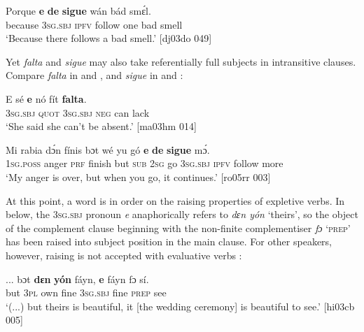 \ea%
    \label{ex:key:1149}
    \gll Porque  \textbf{e}    \textbf{de}  \textbf{sigue}  wán  bád  smɛ́l.\\
because  \textsc{3sg.sbj}  \textsc{ipfv}  follow  one  bad  smell\\

\glt ‘Because there follows a bad smell.’   [dj03do 049]
\z

Yet \textit{falta} and \textit{sigue} may also take referentially full subjects in intransitive clauses. Compare \textit{falta} in  and , and \textit{sigue} in  and :


\ea%
    \label{ex:key:1150}
    \gll \textsc{E}    sé    \textbf{e}    nó  fít    \textbf{falta}.\\
\textsc{3sg.sbj}  \textsc{quot}    \textsc{3sg.sbj}  \textsc{neg}  can    lack\\

\glt ‘She said she can’t be absent.’ [ma03hm 014]
\z


\ea%
    \label{ex:key:1151}
    \gll Mi    rabia  dɔ́n  fínis    bɔt  wé  yu  gó
\textbf{e}    \textbf{de}  \textbf{sigue}  mɔ́.\\
\textsc{1sg.poss}  anger  \textsc{prf}  finish  but  \textsc{sub}  \textsc{2sg}  go
\textsc{3sg.sbj}  \textsc{ipfv}  follow  more\\

\glt ‘My anger is over, but when you go, it continues.’ [ro05rr 003]
\z

At this point, a word is in order on the raising properties of expletive verbs. In  below, the \textsc{3sg.sbj} pronoun \textit{e} anaphorically refers to \textit{dɛn yón} ‘theirs’, so the object of the complement clause beginning with the non-finite complementiser \textit{fɔ} ‘\textsc{prep}’ has been raised into subject position in the main clause. For other speakers, however, raising is not accepted with evaluative verbs : 


\ea%
    \label{ex:key:1152}
    \gll \op...\cp{}  bɔt  \textbf{dɛn}  \textbf{yón}     fáyn,  \textbf{e}    fáyn    fɔ  sí.\\
  {} but  \textsc{3pl}  own    fine    \textsc{3sg.sbj}  fine    \textsc{prep}  see\\

\glt ‘(...) but theirs is beautiful, it [the wedding ceremony] is beautiful to see.’ [hi03cb 005]
\z


\z

